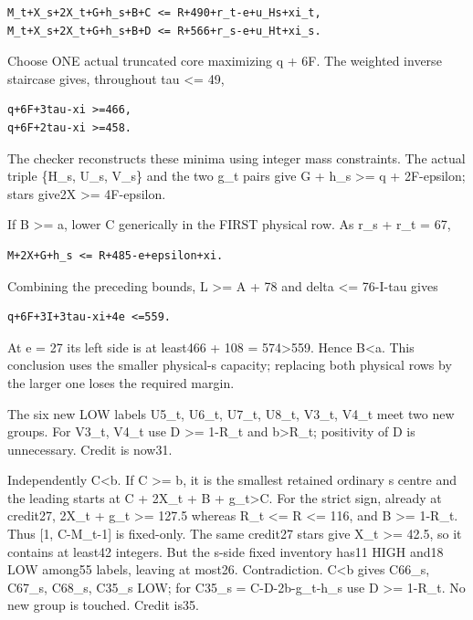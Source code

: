 \documentclass[11pt,a4paper]{article}
\begin{document}
\begin{verbatim}
M_t+X_s+2X_t+G+h_s+B+C <= R+490+r_t-e+u_Hs+xi_t,
M_t+X_s+2X_t+G+h_s+B+D <= R+566+r_s-e+u_Ht+xi_s.
\end{verbatim}

Choose ONE actual truncated core maximizing q + 6F. The weighted inverse
staircase gives, throughout tau \textless= 49,

\begin{verbatim}
q+6F+3tau-xi >=466,
q+6F+2tau-xi >=458.
\end{verbatim}

The checker reconstructs these minima using integer mass constraints.
The actual triple \{H\_s, U\_s, V\_s\} and the two g\_t pairs give G +
h\_s \textgreater= q + 2F-epsilon; stars give2X \textgreater=
4F-epsilon.

If B \textgreater= a, lower C generically in the FIRST physical row. As
r\_s + r\_t = 67,

\begin{verbatim}
M+2X+G+h_s <= R+485-e+epsilon+xi.
\end{verbatim}

Combining the preceding bounds, L \textgreater= A + 78 and delta
\textless= 76-I-tau gives

\begin{verbatim}
q+6F+3I+3tau-xi+4e <=559.
\end{verbatim}

At e = 27 its left side is at least466 + 108 = 574\textgreater559. Hence
B\textless a. This conclusion uses the smaller physical-s capacity;
replacing both physical rows by the larger one loses the required
margin.

The six new LOW labels U5\_t, U6\_t, U7\_t, U8\_t, V3\_t, V4\_t meet two
new groups. For V3\_t, V4\_t use D \textgreater= 1-R\_t and
b\textgreater R\_t; positivity of D is unnecessary. Credit is now31.

Independently C\textless b. If C \textgreater= b, it is the smallest
retained ordinary s centre and the leading starts at C + 2X\_t + B +
g\_t\textgreater C. For the strict sign, already at credit27, 2X\_t +
g\_t \textgreater= 127.5 whereas R\_t \textless= R \textless= 116, and B
\textgreater= 1-R\_t. Thus {[}1, C-M\_t-1{]} is fixed-only. The same
credit27 stars give X\_t \textgreater= 42.5, so it contains at least42
integers. But the s-side fixed inventory has11 HIGH and18 LOW among55
labels, leaving at most26. Contradiction. C\textless b gives C66\_s,
C67\_s, C68\_s, C35\_s LOW; for C35\_s = C-D-2b-g\_t-h\_s use D
\textgreater= 1-R\_t. No new group is touched. Credit is35.
\end{document}
